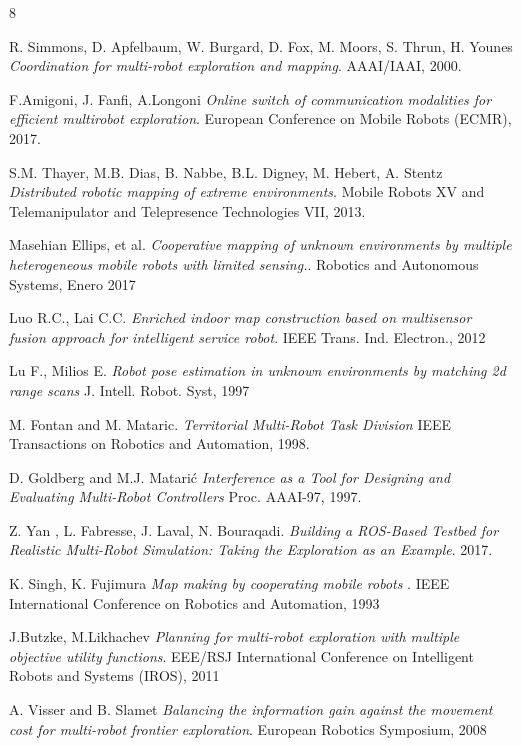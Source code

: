 \documentclass[runningheads]{llncs}
\begin{document}
\begin{thebibliography}{8}
	
R. Simmons, D. Apfelbaum, W. Burgard, D. Fox, M. Moors, S. Thrun, H. Younes
\textit{Coordination for multi-robot exploration and mapping}. 
AAAI/IAAI, 2000.	
	
F.Amigoni, J. Fanfi, A.Longoni
\textit{Online switch of communication modalities for efficient multirobot exploration}. 
European Conference on Mobile Robots (ECMR), 2017.

S.M. Thayer, M.B. Dias, B. Nabbe, B.L. Digney, M. Hebert, A. Stentz
\textit{Distributed robotic mapping of extreme environments}. 
Mobile Robots XV and Telemanipulator and Telepresence Technologies VII, 2013.

Masehian Ellips, et al.
\textit{Cooperative mapping of unknown environments by multiple heterogeneous mobile robots with limited sensing.}. 
Robotics and Autonomous Systems, Enero 2017
		
Luo R.C., Lai C.C.
\textit{Enriched indoor map construction based on multisensor fusion approach for intelligent service robot}. 
IEEE Trans. Ind. Electron., 2012

Lu F., Milios E.
\textit{Robot pose estimation in unknown environments by matching 2d range scans}
J. Intell. Robot. Syst, 1997

M. Fontan and M. Mataric.
\textit{Territorial Multi-Robot Task Division}
IEEE Transactions on Robotics and Automation, 1998.

D. Goldberg and M.J. Matarić
\textit{Interference as a Tool for Designing and Evaluating Multi-Robot Controllers}
Proc. AAAI-97, 1997.

Z. Yan , L. Fabresse, J. Laval, N. Bouraqadi.
\textit{Building a ROS-Based Testbed for Realistic Multi-Robot Simulation: Taking the Exploration as an Example}.
2017.

K. Singh, K. Fujimura
\textit{Map making by cooperating mobile robots }.
IEEE International Conference on Robotics and Automation, 1993 	

J.Butzke, M.Likhachev
\textit{Planning for multi-robot exploration with multiple objective utility functions}.
EEE/RSJ International Conference on Intelligent Robots and Systems (IROS), 2011

A. Visser and B. Slamet
\textit{Balancing the information gain against the movement cost for multi-robot frontier exploration}.
European Robotics Symposium, 2008


\end{thebibliography}
\end{document}
